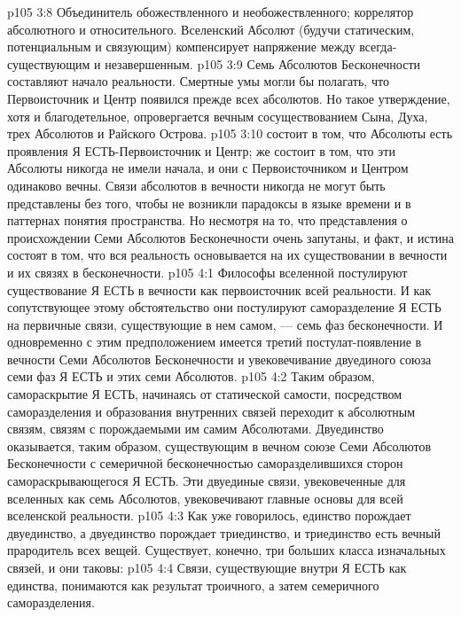 \vs p105 3:8 \bibnobreakspace {} Объединитель обожествленного и необожествленного; коррелятор абсолютного и относительного. Вселенский Абсолют (будучи статическим, потенциальным и связующим) компенсирует напряжение между всегда\hyp{}существующим и незавершенным.
\vs p105 3:9 \pc Семь Абсолютов Бесконечности составляют начало реальности. Смертные умы могли бы полагать, что Первоисточник и Центр появился прежде всех абсолютов. Но такое утверждение, хотя и благодетельное, опровергается вечным сосуществованием Сына, Духа, трех Абсолютов и Райского Острова.
\vs p105 3:10  состоит в том, что Абсолюты есть проявления Я ЕСТЬ\hyp{}Первоисточник и Центр;  же состоит в том, что эти Абсолюты никогда не имели начала, и они с Первоисточником и Центром одинаково вечны. Связи абсолютов в вечности никогда не могут быть представлены без того, чтобы не возникли парадоксы в языке времени и в паттернах понятия пространства. Но несмотря на то, что представления о происхождении Семи Абсолютов Бесконечности очень запутаны, и факт, и истина состоят в том, что вся реальность основывается на их существовании в вечности и их связях в бесконечности.
\vs p105 4:1 Философы вселенной постулируют существование Я ЕСТЬ в вечности как первоисточник всей реальности. И как сопутствующее этому обстоятельство они постулируют саморазделение Я ЕСТЬ на первичные связи, существующие в нем самом, --- семь фаз бесконечности. И одновременно с этим предположением имеется третий постулат\hyp{}появление в вечности Семи Абсолютов Бесконечности и увековечивание двуединого союза семи фаз Я ЕСТЬ и этих семи Абсолютов.
\vs p105 4:2 Таким образом, самораскрытие Я ЕСТЬ, начинаясь от статической самости, посредством саморазделения и образования внутренних связей переходит к абсолютным связям, связям с порождаемыми им самим Абсолютами. Двуединство оказывается, таким образом, существующим в вечном союзе Семи Абсолютов Бесконечности с семеричной бесконечностью саморазделившихся сторон самораскрывающегося Я ЕСТЬ. Эти двуединые связи, увековеченные для вселенных как семь Абсолютов, увековечивают главные основы для всей вселенской реальности.
\vs p105 4:3 Как уже говорилось, единство порождает двуединство, а двуединство порождает триединство, и триединство есть вечный прародитель всех вещей. Существует, конечно, три больших класса изначальных связей, и они таковы:
\vs p105 4:4 \bibnobreakspace {} Связи, существующие внутри Я ЕСТЬ как единства, понимаются как результат троичного, а затем семеричного саморазделения.
